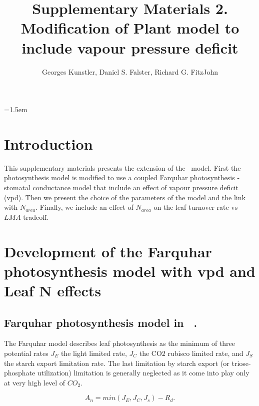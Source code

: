 \documentclass[a4paper,11pt]{article}
\title{Supplementary Materials 2. Modification of Plant model to
  include vapour pressure deficit}
\author{Georges Kunstler, Daniel S. Falster, Richard G. FitzJohn}
\date{}
\affiliation{INRAE LESSEM, Grenoble, France and Department of Biological Sciences, Macquarie University,
  Sydney, Australia}
\date{}
\begin{document}
\mstitleshort
\parindent=1.5em
\addtolength{\parskip}{.3em}


\section{Introduction}

This supplementary materials presents the extension of the \plant\
model. First the photosynthesis model is modified to use a coupled Farquhar
photosynthesis - stomatal conductance model that include an effect of vapour pressure deficit
(vpd). Then we present the choice of the parameters of the model and the link with
$N_{area}$. Finally,  we include an effect of $N_{area}$ on the leaf
turnover rate vs
$LMA$ tradeoff.

\section{Development of the Farquhar photosynthesis model with vpd and Leaf N effects}

\subsection{Farquhar photosynthesis model  in \plant\ .}

The Farquhar model describes leaf photosynthesis as the minimum
of three potential rates $J_E$ the light limited rate, $J_C$ the CO2
rubisco limited rate, and $J_S$ the starch export limitation rate. The
last limitation by starch export (or triose-phosphate utilization)
limitation is generally neglected as it come into play only at very
high level of $CO_2$.

\begin{equation}
\label{eq:An}
A_n= min(J_E, J_C, J_s) - R_d.
\end{equation}


\end{document}
